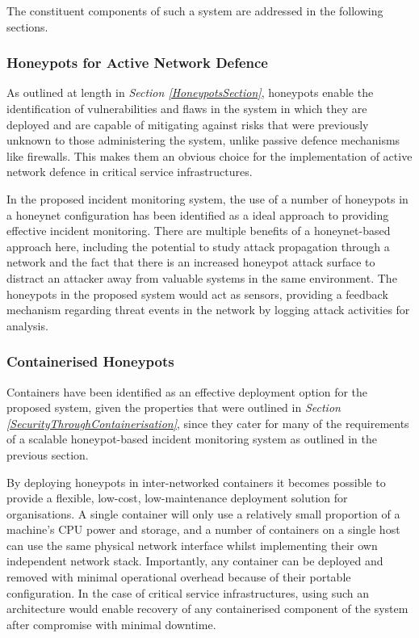 The constituent components of such a system are addressed in the following sections.

\subsubsection{Honeypots for Active Network Defence}
As outlined at length in \textit{Section \ref{HoneypotsSection}}, honeypots enable the identification of vulnerabilities and flaws in the system in which they are deployed and are capable of mitigating against risks that were previously unknown to those administering the system, unlike passive defence mechanisms like firewalls. This makes them an obvious choice for the implementation of active network defence in critical service infrastructures.

In the proposed incident monitoring system, the use of a number of honeypots in a honeynet configuration has been identified as a ideal approach to providing effective incident monitoring. There are multiple benefits of a honeynet-based approach here, including the potential to study attack propagation through a network and the fact that there is an increased honeypot attack surface to distract an attacker away from valuable systems in the same environment. The honeypots in the proposed system would act as sensors, providing a feedback mechanism regarding threat events in the network by logging attack activities for analysis.



\subsubsection{Containerised Honeypots}
Containers have been identified as an effective deployment option for the proposed system, given the properties that were outlined in \textit{Section \ref{SecurityThroughContainerisation}}, since they cater for many of the requirements of a scalable honeypot-based incident monitoring system as outlined in the previous section.

By deploying honeypots in inter-networked containers it becomes possible to provide a flexible, low-cost, low-maintenance deployment solution for organisations. A single container will only use a relatively small proportion of a machine's CPU power and storage, and a number of containers on a single host can use the same physical network interface whilst implementing their own independent network stack. \cite{LXCsForDeceptiveHoneypots2017} Importantly, any container can be deployed and removed with minimal operational overhead because of their portable configuration. In the case of critical service infrastructures, using such an architecture would enable recovery of any containerised component of the system after compromise with minimal downtime. 

